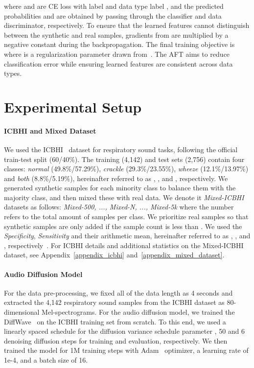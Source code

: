 \documentclass{article}
\begin{document}
where  and  are CE loss with label  and data type label , and the predicted probabilities  and  are obtained by passing through the classifier and data discriminator, respectively. To ensure that the learned features cannot distinguish between the synthetic and real samples, gradients from  are multiplied by a negative constant during the backpropagation. The final training objective is  where  is a regularization parameter drawn from~\cite{ganin2016domain}. The AFT aims to reduce classification error while ensuring learned features are consistent across data types.


\section{Experimental Setup}
\paragraph{ICBHI and Mixed Dataset} We used the ICBHI~\cite{rocha2018alpha} dataset for respiratory sound tasks, following the official train-test split (60/40\%). 
The training (4,142) and test sets (2,756) contain four classes: \emph{normal} (49.8\%/57.29\%), \emph{crackle} (29.3\%/23.55\%), \emph{wheeze} (12.1\%/13.97\%) and \emph{both} (8.8\%/5.19\%), hereinafter referred to as , ,  and , respectively.
We generated synthetic samples for each minority class to balance them with the majority class, and then mixed these with real data. We denote it \emph{Mixed-ICBHI} datasets as follows: \emph{Mixed-500, ..., Mixed-N, ..., Mixed-5k} where the number  refers to the total amount of samples per class. 
We prioritize real samples so that synthetic samples are only added if the sample count is less than .
We used the \emph{Specificity}, \emph{Sensitivity} and their arithmetic mean, hereinafter referred to as , , and , respectively~\cite{rocha2018alpha}. For ICBHI details and additional statistics on the Mixed-ICBHI dataset, see Appendix~\ref{appendix_icbhi} and~\ref{appendix_mixed_dataset}.

\paragraph{Audio Diffusion Model}
For the data pre-processing, we fixed all of the data length as 4 seconds and extracted the 4,142 respiratory sound samples from the ICBHI dataset as 80-dimensional Mel-spectrograms. For the audio diffusion model, we trained the DiffWave~\cite{kochetov2020generative} on the ICBHI training set from scratch. To this end, we used a linearly spaced schedule for the diffusion variance schedule parameter  , 50 and 6 denoising diffusion steps for training and evaluation, respectively. We then trained the model for 1M training steps with Adam~\cite{kingma2014adam} optimizer, a learning rate of 1e-4, and a batch size of 16. 
\end{document}
